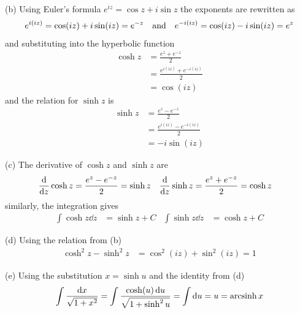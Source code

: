 \documentclass[../problems.tex]{subfiles}
\begin{document}
(b) Using Euler's formula $e^{iz} = \cos z + i \sin z$ the exponents are rewritten as
\begin{equation*}
    e^{i(iz)} = \cos(iz) + i \sin(iz) = e^{-z} \qand e^{-i(iz)} = \cos(iz) - i \sin(iz) = e^z
\end{equation*}
and substituting into the hyperbolic function
\begin{align*}
    \cosh z &= \frac{e^z + e^{-z}}{2} \\
    &= \frac{e^{i(iz)} + e^{-i(iz)}}{2} \\
    &= \cos(iz)
\end{align*}
and the relation for $\sinh z$ is
\begin{align*}
    \sinh z &= \frac{e^z - e^{-z}}{2} \\
    &= \frac{e^{i(iz)} - e^{-i(iz)}}{2} \\
    &= -i \sin(iz)
\end{align*}

(c) The derivative of $\cosh z$ and $\sinh z$ are
\begin{align*}
    \dv{z} \cosh z &= \frac{e^z - e^{-z}}{2} = \sinh z & \dv{z} \sinh z &= \frac{e^z + e^{-z}}{2} 
        = \cosh z
\end{align*}
similarly, the integration gives
\begin{align*}
    \int \cosh z \dd{z} &= \sinh z + C & \int \sinh z \dd{z} &= \cosh z + C
\end{align*}

(d) Using the relation from (b)
\begin{align*}
    \cosh^2 z - \sinh^2 z &= \cos^2(iz) + \sin^2(iz) = 1
\end{align*}

(e) Using the substitution $x = \sinh u$ and the identity from (d)
\begin{align*}
    \int \frac{\dd{x}}{\sqrt{1+x^2}} = \int \frac{\cosh(u)\dd{u}}{\sqrt{1+\sinh^2 u}} 
    = \int \dd{u} = u
    = \operatorname{arcsinh} x  
\end{align*}
\end{document}
